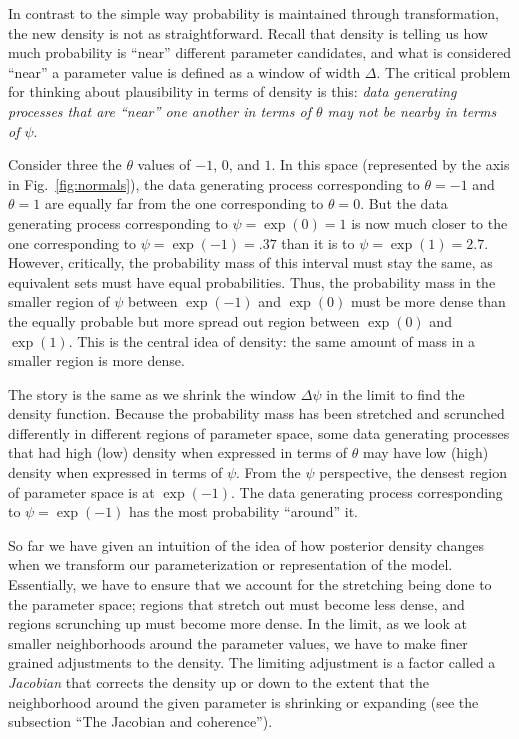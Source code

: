\documentclass[man]{apa}
\begin{document}
In contrast to the simple way probability is maintained through transformation, the new density is not as straightforward.
Recall that density is telling us how much probability is ``near'' different parameter candidates, and what is considered ``near'' a parameter value is defined as a window of width $\Delta$.
The critical problem for thinking about plausibility in terms of density is this: \textit{data generating processes that are ``near'' one another in terms of $\theta$ may not be nearby in terms of $\psi$}. 

Consider three the $\theta$ values of $-1$, $0$, and $1$. In this space (represented by the axis in Fig.~\ref{fig:normals}), the data generating process corresponding to $\theta=-1$ and $\theta=1$ are equally far from the one corresponding to $\theta=0$.
But the data generating process corresponding to $\psi=\exp{(0)}=1$ is now much closer to the one corresponding to $\psi=\exp{(-1)} = .37$ than it is to $\psi=\exp{(1)}= 2.7$.
However, critically, the probability mass of this interval must stay the same, as equivalent sets must have equal probabilities. Thus, the probability mass in the smaller region of $\psi$ between $\exp{(-1)}$ and $\exp{(0)}$ must be more dense than the equally probable but more spread out region between $\exp{(0)}$ and $\exp{(1)}$. This is the central idea of density: the same amount of mass in a smaller region is more dense. 

The story is the same as we shrink the window $\Delta\psi$ in the limit to find the density function. Because the probability mass has been stretched and scrunched differently in different regions of parameter space, some data generating processes that had high (low) density when expressed in terms of $\theta$ may have low (high) density when expressed in terms of $\psi$.
From the $\psi$ perspective, the densest region of parameter space is at $\exp{(-1)}$. The data generating process corresponding to $\psi=\exp{(-1)}$ has the most probability ``around'' it. 

So far we have given an intuition of the idea of how posterior density changes when we transform our parameterization or representation of the model. Essentially, we have to ensure that we account for the stretching being done to the parameter space; regions that stretch out must become less dense, and regions scrunching up must become more dense. 
In the limit, as we look at smaller neighborhoods around the parameter values, we have to make finer grained adjustments to the density. The limiting adjustment is a factor called a \textit{Jacobian} that corrects the density up or down to the extent that the neighborhood around the given parameter is shrinking or expanding (see the subsection ``The Jacobian and coherence''). 
\end{document}
